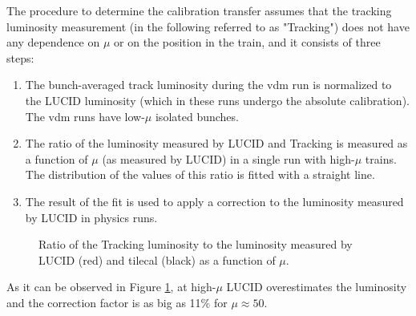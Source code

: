 The procedure to determine the calibration transfer assumes that the tracking luminosity measurement 
(in the following referred to as "Tracking") 
does not have any dependence on $\mu$ or on the position in the train, and it consists of three steps:
\begin{enumerate}
\item The bunch-averaged track luminosity during the \gls{vdm} run is normalized to the LUCID luminosity (which in these runs 
undergo the absolute calibration). The \gls{vdm} runs have low-$\mu$ isolated bunches.
\item The ratio of the luminosity measured by LUCID and Tracking is measured as a function of $\mu$ (as measured by LUCID) 
in a single run with high-$\mu$ trains. The distribution of the values of this ratio is fitted with a straight line.
\item The result of the fit is used to apply a correction to the luminosity measured by LUCID in physics runs. 
\end{enumerate}

\begin{figure}[ht]
\centering
{}
\caption{Ratio of the Tracking luminosity to the luminosity measured by LUCID (red) and \gls{tilecal} (black) as a function of $\mu$.}
\label{fig:apppmt:calib_transfer}
\end{figure}

As it can be observed in Figure \ref{fig:apppmt:calib_transfer}, at high-$\mu$ LUCID overestimates the luminosity and 
the correction factor is as big as 11\% for $\mu \approx 50$. 

